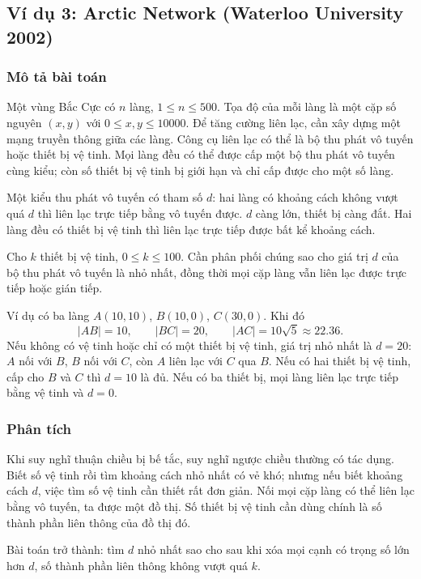 \documentclass[11pt]{article}
\begin{document}
\subsection{Ví dụ 3: Arctic Network (Waterloo University 2002)}

\subsubsection*{Mô tả bài toán}

Một vùng Bắc Cực có $n$ làng, $1\le n\le 500$. Tọa độ của mỗi làng là một cặp
số nguyên $(x,y)$ với $0\le x,y\le 10000$. Để tăng cường liên lạc, cần xây
dựng một mạng truyền thông giữa các làng. Công cụ liên lạc có thể là bộ thu
phát vô tuyến hoặc thiết bị vệ tinh. Mọi làng đều có thể được cấp một bộ thu
phát vô tuyến cùng kiểu; còn số thiết bị vệ tinh bị giới hạn và chỉ cấp được
cho một số làng.

Một kiểu thu phát vô tuyến có tham số $d$: hai làng có khoảng cách không vượt
quá $d$ thì liên lạc trực tiếp bằng vô tuyến được. $d$ càng lớn, thiết bị càng
đắt. Hai làng đều có thiết bị vệ tinh thì liên lạc trực tiếp được bất kể
khoảng cách.

Cho $k$ thiết bị vệ tinh, $0\le k\le 100$. Cần phân phối chúng sao cho giá trị
$d$ của bộ thu phát vô tuyến là nhỏ nhất, đồng thời mọi cặp làng vẫn liên lạc
được trực tiếp hoặc gián tiếp.

Ví dụ có ba làng $A(10,10)$, $B(10,0)$, $C(30,0)$. Khi đó
\[
  |AB|=10,\qquad |BC|=20,\qquad |AC|=10\sqrt 5\approx 22.36.
\]
Nếu không có vệ tinh hoặc chỉ có một thiết bị vệ tinh, giá trị nhỏ nhất là
$d=20$: $A$ nối với $B$, $B$ nối với $C$, còn $A$ liên lạc với $C$ qua $B$.
Nếu có hai thiết bị vệ tinh, cấp cho $B$ và $C$ thì $d=10$ là đủ. Nếu có ba
thiết bị, mọi làng liên lạc trực tiếp bằng vệ tinh và $d=0$.

\subsubsection*{Phân tích}

Khi suy nghĩ thuận chiều bị bế tắc, suy nghĩ ngược chiều thường có tác dụng.
Biết số vệ tinh rồi tìm khoảng cách nhỏ nhất có vẻ khó; nhưng nếu biết khoảng
cách $d$, việc tìm số vệ tinh cần thiết rất đơn giản. Nối mọi cặp làng có thể
liên lạc bằng vô tuyến, ta được một đồ thị. Số thiết bị vệ tinh cần dùng chính
là số thành phần liên thông của đồ thị đó.

Bài toán trở thành: tìm $d$ nhỏ nhất sao cho sau khi xóa mọi cạnh có trọng số
lớn hơn $d$, số thành phần liên thông không vượt quá $k$.
\end{document}
